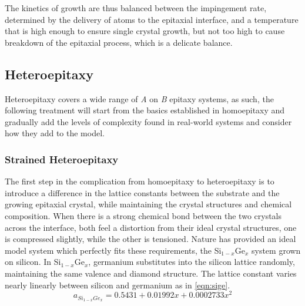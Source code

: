 The kinetics of growth are thus balanced between the impingement rate, determined by the delivery of atoms to the epitaxial interface, and a temperature that is high enough to ensure single crystal growth, but not too high to cause breakdown of the epitaxial process, which is a delicate balance.

\subsection{Heteroepitaxy} 
Heteroepitaxy covers a wide range of \emph{A} on \emph{B} epitaxy systems, as such, the following treatment will start from the basics established in homoepitaxy and gradually add the levels of complexity found in real-world systems and consider how they add to the model.

\subsubsection{Strained Heteroepitaxy} The first step in the complication from homoepitaxy to heteroepitaxy is to introduce a difference in the lattice constants between the substrate and the growing epitaxial crystal, while maintaining the crystal structures and chemical composition.
When there is a strong chemical bond between the two crystals across the interface, both feel a distortion from their ideal crystal structures, one is compressed slightly, while the other is tensioned\cite{Dunstan1997}.
Nature has provided an ideal model system which perfectly fits these requirements, the Si\(_{1-x}\)Ge\(_x\) system grown on silicon\cite{Paul2004}.
In Si\(_{1-x}\)Ge\(_x\), germanium substitutes into the silicon lattice randomly, maintaining the same valence and diamond structure.
The lattice constant varies nearly linearly between silicon and germanium as in \cref{eqn:sige}.
\begin{equation}
 a_{Si_{1-x}Ge_x} = 0.5431 + 0.01992x + 0.0002733x^2 \label{eqn:sige}
\end{equation}

